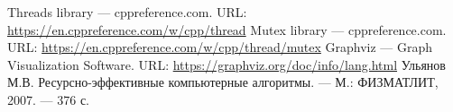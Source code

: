 \begin{thebibliography}{9}
         Threads library --- cppreference.com. URL: \url{https://en.cppreference.com/w/cpp/thread}
         Mutex library --- cppreference.com. URL: \url{https://en.cppreference.com/w/cpp/thread/mutex}
         Graphviz --- Graph Visualization Software. URL: \url{https://graphviz.org/doc/info/lang.html}
         Ульянов М.В. Ресурсно-эффективные компьютерные алгоритмы. --- М.: ФИЗМАТЛИТ, 2007. --- 376 с.
\end{thebibliography}

\clearpage
